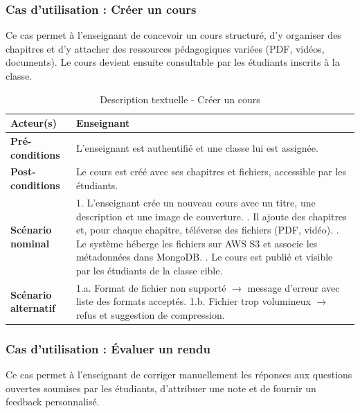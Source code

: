 \subsubsection{Cas d'utilisation : Créer un cours}
Ce cas permet à l'enseignant de concevoir un cours structuré, d'y organiser des chapitres et d'y attacher des ressources pédagogiques variées (PDF, vidéos, documents). Le cours devient ensuite consultable par les étudiants inscrits à la classe.

\begin{table}[H]
\centering
\small
\begin{tabularx}{\textwidth}{|l|X|}
\hline
\rowcolor[HTML]{EFEFEF} 
\textbf{Acteur(s)} & Enseignant \\ \hline
\textbf{Pré-conditions} & L'enseignant est authentifié et une classe lui est assignée. \\ \hline
\textbf{Post-conditions} & Le cours est créé avec ses chapitres et fichiers, accessible par les étudiants. \\ \hline
\textbf{Scénario nominal} & 
1. L'enseignant crée un nouveau cours avec un titre, une description et une image de couverture. \newline
2. Il ajoute des chapitres et, pour chaque chapitre, téléverse des fichiers (PDF, vidéo). \newline
3. Le système héberge les fichiers sur AWS S3 et associe les métadonnées dans MongoDB. \newline
4. Le cours est publié et visible par les étudiants de la classe cible. \\ \hline
\textbf{Scénario alternatif} & 
1.a. Format de fichier non supporté $\rightarrow$ message d'erreur avec liste des formats acceptés. \newline
1.b. Fichier trop volumineux $\rightarrow$ refus et suggestion de compression. \\ \hline
\end{tabularx}
\caption{Description textuelle - Créer un cours}
\end{table}

\subsubsection{Cas d'utilisation : Évaluer un rendu}
Ce cas permet à l'enseignant de corriger manuellement les réponses aux questions ouvertes soumises par les étudiants, d'attribuer une note et de fournir un feedback personnalisé.

